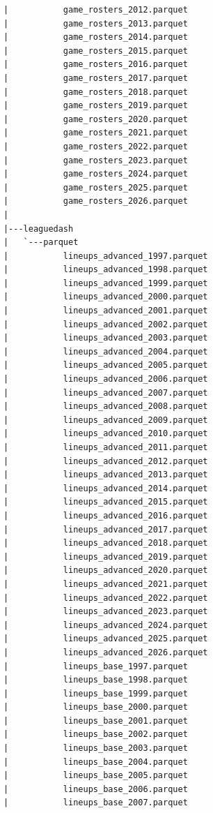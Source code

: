 \begin{lstlisting}
      |           game_rosters_2012.parquet
      |           game_rosters_2013.parquet
      |           game_rosters_2014.parquet
      |           game_rosters_2015.parquet
      |           game_rosters_2016.parquet
      |           game_rosters_2017.parquet
      |           game_rosters_2018.parquet
      |           game_rosters_2019.parquet
      |           game_rosters_2020.parquet
      |           game_rosters_2021.parquet
      |           game_rosters_2022.parquet
      |           game_rosters_2023.parquet
      |           game_rosters_2024.parquet
      |           game_rosters_2025.parquet
      |           game_rosters_2026.parquet
      |
      |---leaguedash
      |   `---parquet
      |           lineups_advanced_1997.parquet
      |           lineups_advanced_1998.parquet
      |           lineups_advanced_1999.parquet
      |           lineups_advanced_2000.parquet
      |           lineups_advanced_2001.parquet
      |           lineups_advanced_2002.parquet
      |           lineups_advanced_2003.parquet
      |           lineups_advanced_2004.parquet
      |           lineups_advanced_2005.parquet
      |           lineups_advanced_2006.parquet
      |           lineups_advanced_2007.parquet
      |           lineups_advanced_2008.parquet
      |           lineups_advanced_2009.parquet
      |           lineups_advanced_2010.parquet
      |           lineups_advanced_2011.parquet
      |           lineups_advanced_2012.parquet
      |           lineups_advanced_2013.parquet
      |           lineups_advanced_2014.parquet
      |           lineups_advanced_2015.parquet
      |           lineups_advanced_2016.parquet
      |           lineups_advanced_2017.parquet
      |           lineups_advanced_2018.parquet
      |           lineups_advanced_2019.parquet
      |           lineups_advanced_2020.parquet
      |           lineups_advanced_2021.parquet
      |           lineups_advanced_2022.parquet
      |           lineups_advanced_2023.parquet
      |           lineups_advanced_2024.parquet
      |           lineups_advanced_2025.parquet
      |           lineups_advanced_2026.parquet
      |           lineups_base_1997.parquet
      |           lineups_base_1998.parquet
      |           lineups_base_1999.parquet
      |           lineups_base_2000.parquet
      |           lineups_base_2001.parquet
      |           lineups_base_2002.parquet
      |           lineups_base_2003.parquet
      |           lineups_base_2004.parquet
      |           lineups_base_2005.parquet
      |           lineups_base_2006.parquet
      |           lineups_base_2007.parquet

\end{lstlisting}
